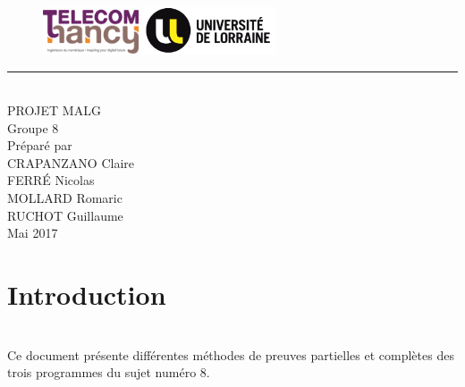 \documentclass{scrreprt}
\date{}
\begin{document}
\thispagestyle{empty}
\begin{bfseries}
    \begin{figure}
      \includegraphics[height=1.4cm]{images/tn.png}
      \hspace{1.2cm}
      \includegraphics[height=1.4cm]{images/ul.png}
      \vspace{3cm}
    \end{figure}
    \begin{flushright}
      \rule{\paperwidth}{1pt}
      \\
      \vspace{2cm}
      \Huge{PROJET MALG}\\
      \vspace{0.5cm}
      \huge
      Groupe 8\\
      \vspace{1.9cm}
      \Large
      \vspace*{\fill}
      Préparé par\\
      \vspace{0.5cm}
      CRAPANZANO Claire\\
      FERRÉ Nicolas\\
      MOLLARD Romaric\\
      RUCHOT Guillaume\\
      \vspace{1.9cm}
      \small
      Mai 2017\\
    \end{flushright}
\end{bfseries}

\clearpage
\setcounter{page}{1}

\tableofcontents
\begin{center}

\end{center}


\chapter{Introduction}
\\
Ce document présente différentes méthodes de preuves partielles et complètes des trois programmes du sujet numéro 8.
\end{document}

